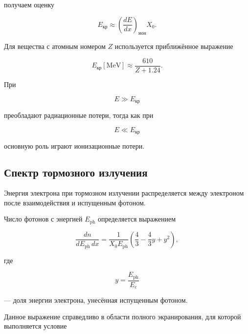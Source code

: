 \documentclass[../final.tex]{subfiles}
\begin{document}
получаем оценку

\begin{equation*}
    E_{\text{кр}}
    \approx
    \left(
        \frac{dE}{dx}
    \right)_{\text{ион}}
    X_0.
\end{equation*}

Для вещества с атомным номером $Z$ используется приближённое выражение

\begin{equation*}
    E_{\text{кр}}[\mathrm{MeV}]
    \approx
    \frac{610}{Z+1.24}.
\end{equation*}

При

\begin{equation*}
    E\gg E_{\text{кр}}
\end{equation*}

преобладают радиационные потери, тогда как при

\begin{equation*}
    E\ll E_{\text{кр}}
\end{equation*}

основную роль играют ионизационные потери.


\subsection{Спектр тормозного излучения}

Энергия электрона при тормозном излучении распределяется
между электроном после взаимодействия и испущенным фотоном.

Число фотонов с энергией $E_{\mathrm{ph}}$ определяется выражением

\begin{equation*}
    \frac{dn}{dE_{\mathrm{ph}}\,dx}
    =
    \frac{1}{X_0E_{\mathrm{ph}}}
    \left(
        \frac{4}{3}
        -\frac{4}{3}y
        +y^2
    \right),
\end{equation*}

где

\begin{equation*}
    y
    =
    \frac{E_{\mathrm{ph}}}{E_e}
\end{equation*}

--- доля энергии электрона, унесённая испущенным фотоном.

Данное выражение справедливо в области полного экранирования,
для которой выполняется условие
\end{document}
